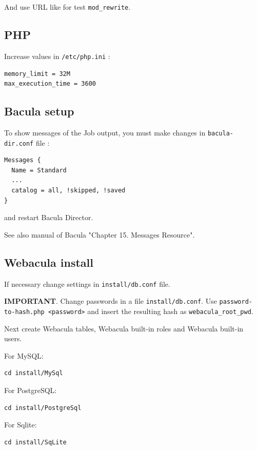 \documentclass[10pt]{article}
\begin{document}
And use URL like
for test \texttt{mod\_rewrite}.


\subsection{PHP}
\label{Install:PHP}

Increase values in \texttt{/etc/php.ini} :
\begin{verbatim}
memory_limit = 32M
max_execution_time = 3600
\end{verbatim}



\subsection{Bacula setup}
\label{Install:Bacula setup}

To show messages of the Job output, you must make changes in \texttt{bacula-dir.conf} file :
\begin{verbatim}
Messages {
  Name = Standard
  ...
  catalog = all, !skipped, !saved
}
\end{verbatim}
and restart Bacula Director.

See also manual of Bacula "Chapter 15. Messages Resource".



\subsection{Webacula install}
\label{Install:Webacula install}

If necessary change settings in \texttt{install/db.conf} file.

\textbf{IMPORTANT}. Change passwords in a file \texttt{install/db.conf}. Use \texttt{password-to-hash.php <password>} and insert the resulting hash as \texttt{webacula\_root\_pwd}.

Next create Webacula tables, Webacula built-in roles and Webacula built-in users.

For MySQL:
\begin{verbatim}
cd install/MySql
\end{verbatim}

For PostgreSQL:
\begin{verbatim}
cd install/PostgreSql
\end{verbatim}

For Sqlite:
\begin{verbatim}
cd install/SqLite
\end{verbatim}
\end{document}
